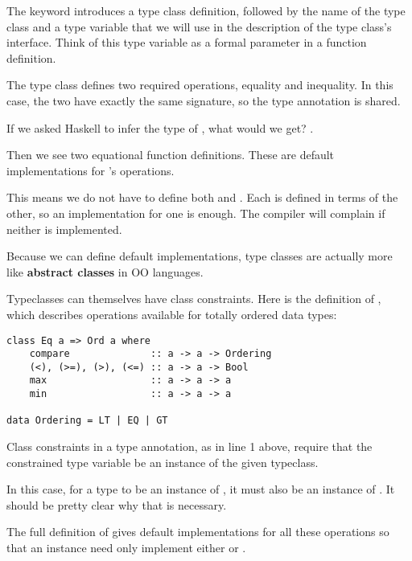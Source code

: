 \begin{notelist}
    \item The  keyword introduces a type class definition, followed by the
          name of the type class and a type variable that we will use in the description
          of the type class's interface. Think of this type variable as a formal parameter
          in a function definition. 

    \item The  type class defines two required operations, equality and inequality.
          In this case, the two have exactly the same signature, so the type annotation
          is shared.

    \item If we asked Haskell to infer the type of \code{(==)}, what would we get?
          .

    \item Then we see two equational function definitions. These are default implementations
          for 's operations.

    \item This means we do not have to define both \code{(==)} and \code{(/=)}. Each is defined
          in terms of the other, so an implementation for one is enough. The compiler will
          complain if neither is implemented.

    \item Because we can define default implementations, type classes are actually more like
          \textbf{abstract classes} in OO languages.
\end{notelist}

Typeclasses can themselves have class constraints. Here is the definition of , which describes
operations available for totally ordered data types:

\begin{lstlisting}
class Eq a => Ord a where
    compare              :: a -> a -> Ordering
    (<), (>=), (>), (<=) :: a -> a -> Bool
    max                  :: a -> a -> a
    min                  :: a -> a -> a

data Ordering = LT | EQ | GT
\end{lstlisting}

\begin{notelist}
    \item Class constraints in a type annotation, as in line 1 above, require that the constrained
          type variable be an instance of the given typeclass.
    
    \item In this case, for a type to be an instance of , it must also be an instance of
          . It should be pretty clear why that is necessary.
    
    \item The full definition of  gives default implementations for all these operations so
          that an instance need only implement either  or \code{(<=)}.
\end{notelist}

